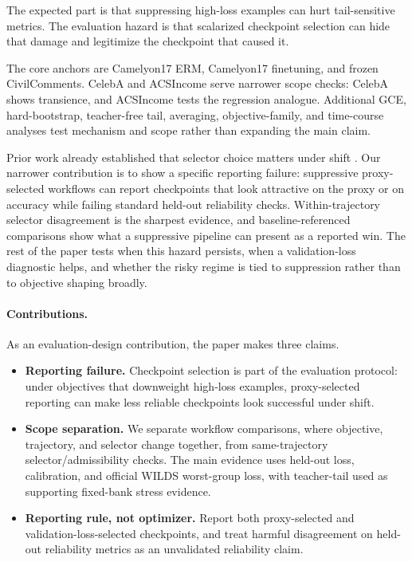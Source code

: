 The expected part is that suppressing high-loss examples can hurt tail-sensitive metrics.
The evaluation hazard is that scalarized checkpoint selection can hide that damage and legitimize the checkpoint that caused it.

The core anchors are Camelyon17 ERM, Camelyon17 finetuning, and frozen CivilComments.
CelebA and ACSIncome serve narrower scope checks: CelebA shows transience, and ACSIncome tests the regression analogue.
Additional GCE, hard-bootstrap, teacher-free tail, averaging, objective-family, and time-course analyses test mechanism and scope rather than expanding the main claim.

Prior work already established that selector choice matters under shift \citep{gulrajani2020domainbed,cha2021swad,arpit2022ensembleaverages,yang2023changeishard,teterwak2025ermpp,naganuma2025pretrainedmodelselection,berta2025refinethencalibrate}.
Our narrower contribution is to show a specific reporting failure: suppressive proxy-selected workflows can report checkpoints that look attractive on the proxy or on accuracy while failing standard held-out reliability checks.
Within-trajectory selector disagreement is the sharpest evidence, and baseline-referenced comparisons show what a suppressive pipeline can present as a reported win.
The rest of the paper tests when this hazard persists, when a validation-loss diagnostic helps, and whether the risky regime is tied to suppression rather than to objective shaping broadly.

\paragraph{Contributions.}
As an evaluation-design contribution, the paper makes three claims.
\begin{itemize}[leftmargin=*,nosep]
\item \textbf{Reporting failure.} Checkpoint selection is part of the evaluation protocol: under objectives that downweight high-loss examples, proxy-selected reporting can make less reliable checkpoints look successful under shift.
\item \textbf{Scope separation.} We separate workflow comparisons, where objective, trajectory, and selector change together, from same-trajectory selector/admissibility checks. The main evidence uses held-out loss, calibration, and official WILDS worst-group loss, with teacher-tail used as supporting fixed-bank stress evidence.
\item \textbf{Reporting rule, not optimizer.} Report both proxy-selected and validation-loss-selected checkpoints, and treat harmful disagreement on held-out reliability metrics as an unvalidated reliability claim.
\end{itemize}
